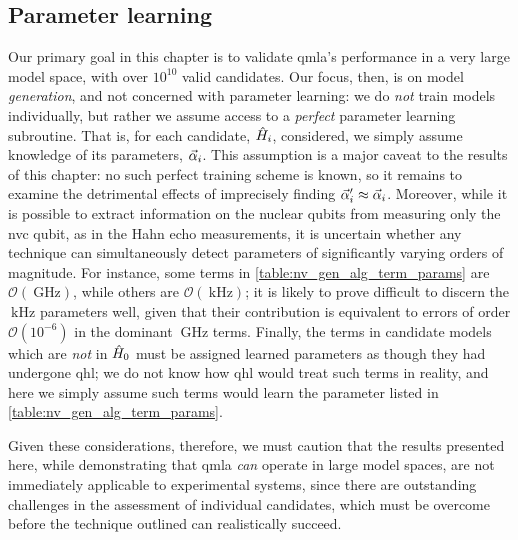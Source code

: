 \subsection{Parameter learning}
Our primary goal in this chapter is to validate \gls{qmla}'s performance in a 
    very large \gls{model space}, with over $10^{10}$ valid candidates. 
Our focus, then, is on model \emph{generation}, and not concerned with parameter learning:
    we do \emph{not} train models individually, but rather we assume access to a \emph{perfect} parameter learning subroutine.
That is, for each candidate, $\hat{H}_i$, considered, we simply assume knowledge of its parameters, $\vec{\alpha}_i$. 
This assumption is a major caveat to the results of this chapter: 
    no such perfect training scheme is known, 
    so it remains to examine the detrimental effects of imprecisely finding $\vec{\alpha}^{\prime}_i \approx \vec{\alpha}_i$. 
Moreover, while it is possible to extract information on the nuclear qubits from measuring only the 
    \gls{nvc} qubit, as in the Hahn echo measurements, 
    it is uncertain whether any technique can simultaneously detect parameters of significantly varying orders of magnitude.
For instance, some terms in \cref{table:nv_gen_alg_term_params} are $\mathcal{O}(\SI{}{\giga\hertz})$, 
    while others are $\mathcal{O}(\SI{}{\kilo\hertz})$;
    it is likely to prove difficult to discern the $\SI{}{\kilo\hertz}$ parameters well, given that their contribution is equivalent 
    to errors of order $\mathcal{O}(10^{-6})$ in the dominant $\SI{}{\giga\hertz}$ terms. 
Finally, the terms in candidate models which are \emph{not} in $\hat{H}_0$ must 
    be assigned learned parameters as though they had undergone \gls{qhl}; 
    we do not know how \gls{qhl} would treat such terms in reality, 
    and here we simply assume such terms would learn the parameter listed in \cref{table:nv_gen_alg_term_params}.
\par

Given these considerations, therefore, we must caution that the results presented here, 
    while demonstrating that \gls{qmla} \emph{can} operate in large model spaces, 
    are not immediately applicable to experimental systems, 
    since there are outstanding challenges in the assessment of individual candidates, 
    which must be overcome before the technique outlined can realistically succeed. 



